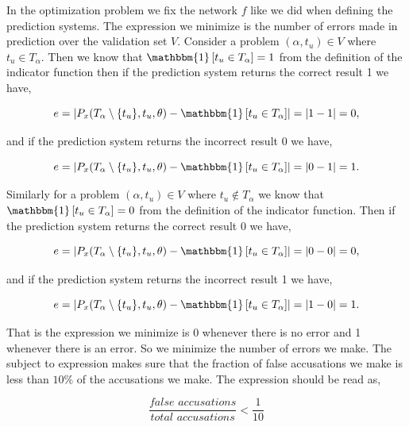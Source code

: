 In the optimization problem we fix the network $f$ like we did when defining
the prediction systems. The expression we minimize is the number of errors made
in prediction over the validation set $V$. Consider a problem $(\alpha, t_u)
\in V$ where $t_u \in T_\alpha$. Then we know that $\mathbbm{1}\left[t_u \in
T_\alpha\right] = 1$ from the definition of the indicator function then if the
prediction system returns the correct result 1 we have,

\begin{equation}
    e = \left|
        P_x(T_\alpha \setminus \{t_u\}, t_u, \theta) -
        \mathbbm{1}\left[t_u \in T_\alpha\right]
    \right| = |1 - 1| = 0,
\end{equation}

and if the prediction system returns the incorrect result 0 we have,

\begin{equation}
    e = \left|
        P_x(T_\alpha \setminus \{t_u\}, t_u, \theta) -
        \mathbbm{1}\left[t_u \in T_\alpha\right]
    \right| = |0 - 1| = 1.
\end{equation}

Similarly for a problem $(\alpha, t_u) \in V$ where $t_u \notin T_\alpha$ we
know that $\mathbbm{1}\left[t_u \in T_\alpha\right] = 0$ from the definition of
the indicator function. Then if the prediction system returns the correct result
0 we have,

\begin{equation}
    e = \left|
        P_x(T_\alpha \setminus \{t_u\}, t_u, \theta) -
        \mathbbm{1}\left[t_u \in T_\alpha\right]
    \right| = |0 - 0| = 0, \end{equation}

and if the prediction system returns the incorrect result 1 we have,

\begin{equation}
    e = \left|
        P_x(T_\alpha \setminus \{t_u\}, t_u, \theta) -
        \mathbbm{1}\left[t_u \in T_\alpha\right]
    \right| = |1 - 0| = 1.
\end{equation}

That is the expression we minimize is 0 whenever there is no error and 1
whenever there is an error. So we minimize the number of errors we make. The
subject to expression makes sure that the fraction of false accusations we make
is less than $10\%$ of the accusations we make. The expression should be read
as,

\begin{equation}
    \frac{\textit{false accusations}}{\textit{total accusations}} < \frac{1}{10}
\end{equation}

